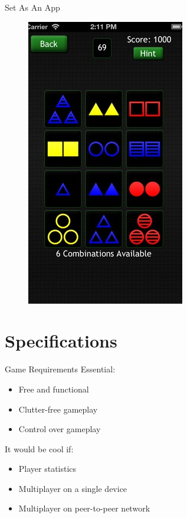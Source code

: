 \documentclass{beamer}
\begin{document}
\begin{frame}[t]{Set As An App}
\begin{figure}[H!]
 \includegraphics[height=.25\paperwidth]{img/combinations.jpg}
\end{figure}

\end{frame}

\section{Specifications}
\begin{frame}[t]{Game Requirements}
Essential:
\begin{itemize}
 \item Free and functional
 \item Clutter-free gameplay
 \item Control over gameplay
\end{itemize}
\pause
\vspace{.5cm}
It would be cool if:
\begin{itemize}
 \item Player statistics
 \item Multiplayer on a single device
 \item Multiplayer on peer-to-peer network
\end{itemize}
\end{frame}
\end{document}
